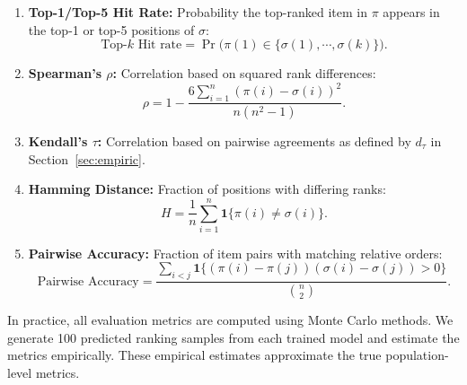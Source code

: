 \documentclass{article}
\begin{document}
\begin{enumerate}
    \item \textbf{Top-1/Top-5 Hit Rate:} Probability the top-ranked item in $\pi$ appears in the top-1 or top-5 positions of $\sigma$:
    \begin{equation}
        \text{Top-$k$ Hit rate} = \Pr\big(\pi(1)\in\{\sigma(1),\cdots, \sigma(k)\}\big).
    \end{equation}
    
    \item \textbf{Spearman's $\rho$:} Correlation based on squared rank differences:
    \[
    \rho = 1 - \frac{6 \sum_{i=1}^{n}( \pi(i)-\sigma(i) )^2}{n(n^2 - 1)}.
    \]
    
    \item \textbf{Kendall's $\tau$:} Correlation based on pairwise agreements as defined by $d_\tau$ in Section~\ref{sec:empiric}.
    
    \item \textbf{Hamming Distance:} Fraction of positions with differing ranks:
    \[
    H = \frac{1}{n}\sum_{i=1}^{n}\mathbf{1}\{\pi(i)\neq \sigma(i)\}.
    \]
    
    \item \textbf{Pairwise Accuracy:} Fraction of item pairs with matching relative orders:
    \[
    \text{Pairwise Accuracy} = \frac{\sum_{i<j}\mathbf{1}\{(\pi(i)-\pi(j))(\sigma(i)-\sigma(j))>0\}}{\binom{n}{2}}.
    \]
\end{enumerate}
In practice, all evaluation metrics are computed using Monte Carlo methods. We generate 100 predicted ranking samples from each trained model and estimate the metrics empirically. These empirical estimates approximate the true population-level metrics.


\end{document}
